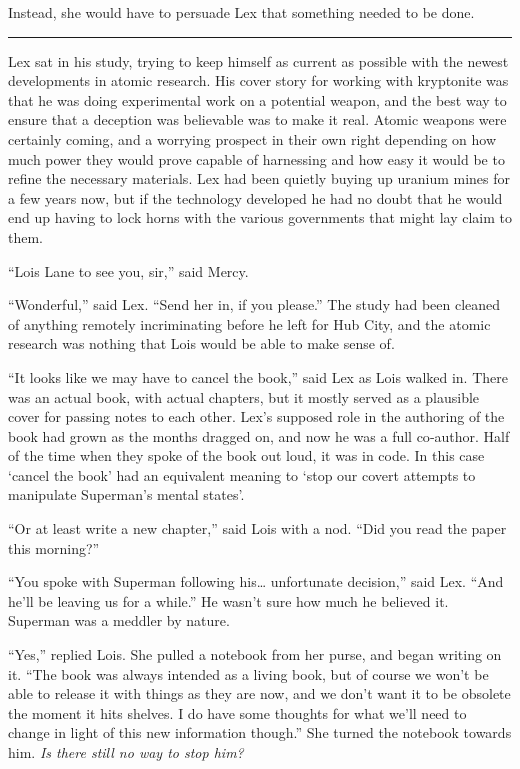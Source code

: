 Instead, she would have to persuade Lex that something needed to be
done.

\begin{center}\rule{0.5\linewidth}{0.5pt}\end{center}

Lex sat in his study, trying to keep himself as current as possible with
the newest developments in atomic research. His cover story for working
with kryptonite was that he was doing experimental work on a potential
weapon, and the best way to ensure that a deception was believable was
to make it real. Atomic weapons were certainly coming, and a worrying
prospect in their own right depending on how much power they would prove
capable of harnessing and how easy it would be to refine the necessary
materials. Lex had been quietly buying up uranium mines for a few years
now, but if the technology developed he had no doubt that he would end
up having to lock horns with the various governments that might lay
claim to them.

``Lois Lane to see you, sir,'' said Mercy.

``Wonderful,'' said Lex. ``Send her in, if you please.'' The study had
been cleaned of anything remotely incriminating before he left for Hub
City, and the atomic research was nothing that Lois would be able to
make sense of.

``It looks like we may have to cancel the book,'' said Lex as Lois
walked in. There was an actual book, with actual chapters, but it mostly
served as a plausible cover for passing notes to each other. Lex's
supposed role in the authoring of the book had grown as the months
dragged on, and now he was a full co‐author. Half of the time when they
spoke of the book out loud, it was in code. In this case `cancel the
book' had an equivalent meaning to `stop our covert attempts to
manipulate Superman's mental states'.

``Or at least write a new chapter,'' said Lois with a nod. ``Did you
read the paper this morning?''

``You spoke with Superman following his\ldots{} unfortunate decision,''
said Lex. ``And he'll be leaving us for a while.'' He wasn't sure how
much he believed it. Superman was a meddler by nature.

``Yes,'' replied Lois. She pulled a notebook from her purse, and began
writing on it. ``The book was always intended as a living book, but of
course we won't be able to release it with things as they are now, and
we don't want it to be obsolete the moment it hits shelves. I do have
some thoughts for what we'll need to change in light of this new
information though.'' She turned the notebook towards him. \emph{Is
there still no way to stop him?}

